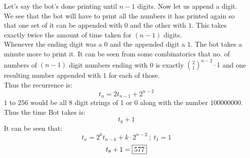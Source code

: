 \begin{solution}\hfil\medskip

  Let's say the bot's done printing until $n-1$ digits. Now let us append a digit.\\
We see that the bot will have to print all the numbers it has printed again so that one set of it can be appended with $0$ and the other with $1$. This takes exactly twice the amount of time taken for $(n-1)$ digits.\\

Whenever the ending digit was a $0$ and the appended digit a $1$. The bot takes a minute more to print it. It can be seen from some combinatorics that no. of numbers of $(n-1)$ digit numbers ending with 0 is exactly ${2 \choose 1}^{n-2} \cdot 1$ and one resulting number appended with $1$ for each of those.\\

Thus the recurrence is:
$$t_n = 2t_{n-1} + 2^{n-2}$$
$1$ to $256$ would be all 8 digit strings of 1 or 0 along with the number $100000000$.
Thus the time Bot takes is:
$$t_8+1$$
It can be seen that:
$$t_n = 2^k t_{n-k} + k\cdot 2^{n-2} \ ; \ t_1 = 1$$
$$t_8+1 = \fbox{577}$$
\end{solution}